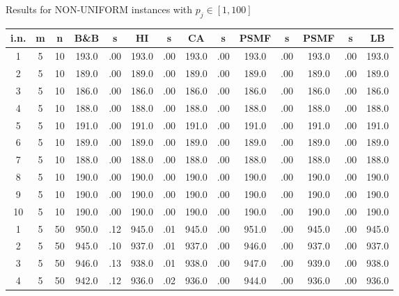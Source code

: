 \documentclass[12pt,a4paper]{article}
\begin{document}
\newpage
\begin{center}
{\footnotesize  Results for NON-UNIFORM instances with $p_j \in
[1,100]$} {\tiny
\begin{tabular}{|ccc|cc|cc|cc|cc|cc|c|}\hline
{\bf i.n.}&{\bf m}&{\bf n}&{\bf B\&B}&{\bf s}&{\bf HI}&{\bf s}&{\bf
CA}&{\bf s}&{\bf PSMF}&{\bf s}&{\bf PSMF}&{\bf s}&{\bf LB}
\\\hline
1             &   5&  10&    193.0&  .00&    193.0&  .00&    193.0&  .00&    193.0&  .00&    193.0&  .00&    193.0\\[-0.01in]
2             &   5&  10&    189.0&  .00&    189.0&  .00&    189.0&  .00&    189.0&  .00&    189.0&  .00&    189.0\\[-0.01in]
3             &   5&  10&    186.0&  .00&    186.0&  .00&    186.0&  .00&    186.0&  .00&    186.0&  .00&    186.0\\[-0.01in]
4             &   5&  10&    188.0&  .00&    188.0&  .00&    188.0&  .00&    188.0&  .00&    188.0&  .00&    188.0\\[-0.01in]
5             &   5&  10&    191.0&  .00&    191.0&  .00&    191.0&  .00&    191.0&  .00&    191.0&  .00&    191.0\\[-0.01in]
6             &   5&  10&    189.0&  .00&    189.0&  .00&    189.0&  .00&    189.0&  .00&    189.0&  .00&    189.0\\[-0.01in]
7             &   5&  10&    188.0&  .00&    188.0&  .00&    188.0&  .00&    188.0&  .00&    188.0&  .00&    188.0\\[-0.01in]
8             &   5&  10&    190.0&  .00&    190.0&  .00&    190.0&  .00&    190.0&  .00&    190.0&  .00&    190.0\\[-0.01in]
9             &   5&  10&    190.0&  .00&    190.0&  .00&    190.0&  .00&    190.0&  .00&    190.0&  .00&    190.0\\[-0.01in]
10            &   5&  10&    190.0&  .00&    190.0&  .00&    190.0&  .00&    190.0&  .00&    190.0&  .00&    190.0\\[-0.01in]
1             &   5&  50&    950.0&  .12&    945.0&  .01&    945.0&  .00&    951.0&  .00&    945.0&  .00&    945.0\\[-0.01in]
2             &   5&  50&    945.0&  .10&    937.0&  .01&    937.0&  .00&    946.0&  .00&    937.0&  .00&    937.0\\[-0.01in]
3             &   5&  50&    946.0&  .13&    938.0&  .01&    938.0&  .00&    947.0&  .00&    939.0&  .00&    938.0\\[-0.01in]
4             &   5&  50&    942.0&  .12&    936.0&  .02&    936.0&  .00&    944.0&  .00&    936.0&  .00&    936.0\\[-0.01in]

\end{tabular}}
\end{center}
\end{document}
